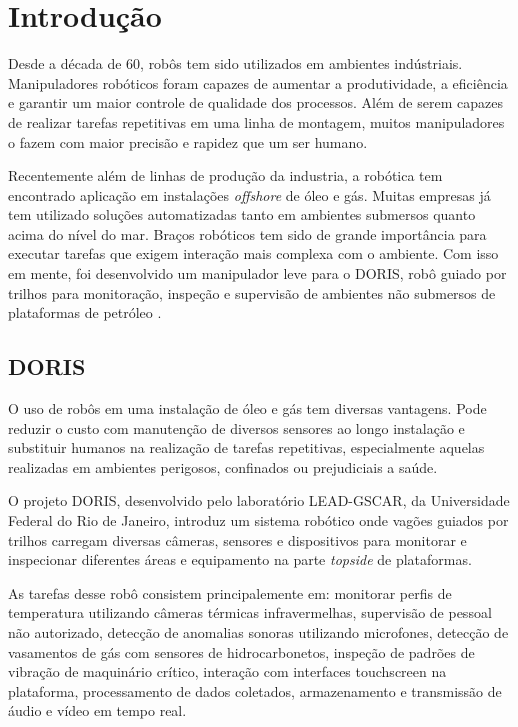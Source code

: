 \chapter{Introdução}

Desde a década de 60, robôs tem sido utilizados em ambientes indústriais. Manipuladores robóticos foram capazes de aumentar a produtividade, a eficiência e garantir um maior controle de qualidade dos processos. Além de serem capazes de realizar tarefas repetitivas em uma linha de montagem, muitos manipuladores o fazem com maior precisão e rapidez que um ser humano.

Recentemente além de linhas de produção da industria, a robótica tem encontrado aplicação em instalações \textit{offshore} de óleo e gás. Muitas empresas já tem utilizado soluções automatizadas tanto em ambientes submersos quanto acima do nível do mar. Braços robóticos tem sido de grande importância para executar tarefas que exigem interação mais complexa com o ambiente. Com isso em mente, foi desenvolvido um manipulador leve para o DORIS, robô guiado por trilhos para monitoração, inspeção e supervisão de ambientes não submersos de plataformas de petróleo \cite{xaud2016doris}.

\section{DORIS}
O uso de robôs em uma instalação de óleo e gás tem diversas vantagens. Pode reduzir o custo com manutenção de diversos sensores ao longo instalação e substituir humanos na realização de tarefas repetitivas, especialmente aquelas realizadas em ambientes perigosos, confinados ou prejudiciais a saúde. 

O projeto DORIS, desenvolvido pelo laboratório LEAD-GSCAR, da Universidade Federal do Rio de Janeiro, introduz um sistema robótico onde vagões guiados por trilhos carregam diversas câmeras, sensores e dispositivos para monitorar e inspecionar diferentes áreas e equipamento na parte \textit{topside} de plataformas.

As tarefas desse robô consistem principalemente em: monitorar perfis de temperatura utilizando câmeras térmicas infravermelhas, supervisão de pessoal não autorizado, detecção de anomalias sonoras utilizando microfones, detecção de vasamentos de gás com sensores de hidrocarbonetos, inspeção de padrões de vibração de maquinário crítico, interação com interfaces touchscreen na plataforma, processamento de dados coletados, armazenamento e transmissão de áudio e vídeo em tempo real.

